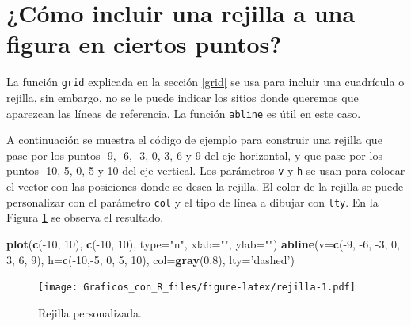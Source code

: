 \documentclass[10pt,]{krantz}
\makeatletter
\newenvironment{Shaded}{\begin{snugshade}}{\end{snugshade}}
\newcommand{\KeywordTok}[1]{\textcolor[rgb]{0.13,0.29,0.53}{\textbf{{#1}}}}
\newcommand{\DataTypeTok}[1]{\textcolor[rgb]{0.13,0.29,0.53}{{#1}}}
\newcommand{\DecValTok}[1]{\textcolor[rgb]{0.00,0.00,0.81}{{#1}}}
\newcommand{\FloatTok}[1]{\textcolor[rgb]{0.00,0.00,0.81}{{#1}}}
\newcommand{\StringTok}[1]{\textcolor[rgb]{0.31,0.60,0.02}{{#1}}}
\newcommand{\NormalTok}[1]{{#1}}
\newenvironment{kframe}{%
\medskip{}
\setlength{\fboxsep}{.8em}
 \def\at@end@of@kframe{}%
 \ifinner\ifhmode%
  \def\at@end@of@kframe{\end{minipage}}%
  \begin{minipage}{\columnwidth}%
 \fi\fi%
 \def\FrameCommand##1{\hskip\@totalleftmargin \hskip-\fboxsep
 \colorbox{shadecolor}{##1}\hskip-\fboxsep
     \hskip-\linewidth \hskip-\@totalleftmargin \hskip\columnwidth}%
 \MakeFramed {\advance\hsize-\width
   \@totalleftmargin\z@ \linewidth\hsize
   \@setminipage}}%
 {\par\unskip\endMakeFramed%
 \at@end@of@kframe}
\renewenvironment{Shaded}{\begin{kframe}}{\end{kframe}}
\makeatother
\begin{document}
\section{\texorpdfstring{¿Cómo incluir una rejilla a una figura en
ciertos puntos?
\label{rejper}}{¿Cómo incluir una rejilla a una figura en ciertos puntos? }}\label{como-incluir-una-rejilla-a-una-figura-en-ciertos-puntos}

La función \texttt{grid} explicada en la sección \ref{grid} se usa para
incluir una cuadrícula o rejilla, sin embargo, no se le puede indicar
los sitios donde queremos que aparezcan las líneas de referencia. La
función \texttt{abline} es útil en este caso.

A continuación se muestra el código de ejemplo para construir una
rejilla que pase por los puntos -9, -6, -3, 0, 3, 6 y 9 del eje
horizontal, y que pase por los puntos -10,-5, 0, 5 y 10 del eje
vertical. Los parámetros \texttt{v} y \texttt{h} se usan para colocar el
vector con las posiciones donde se desea la rejilla. El color de la
rejilla se puede personalizar con el parámetro \texttt{col} y el tipo de
línea a dibujar con \texttt{lty}. En la Figura \ref{fig:rejilla} se
observa el resultado.

\begin{Shaded}
\begin{Highlighting}[]
\KeywordTok{plot}\NormalTok{(}\KeywordTok{c}\NormalTok{(-}\DecValTok{10}\NormalTok{, }\DecValTok{10}\NormalTok{), }\KeywordTok{c}\NormalTok{(-}\DecValTok{10}\NormalTok{, }\DecValTok{10}\NormalTok{), }\DataTypeTok{type=}\StringTok{"n"}\NormalTok{, }\DataTypeTok{xlab=}\StringTok{""}\NormalTok{, }\DataTypeTok{ylab=}\StringTok{""}\NormalTok{)}
\KeywordTok{abline}\NormalTok{(}\DataTypeTok{v=}\KeywordTok{c}\NormalTok{(-}\DecValTok{9}\NormalTok{, -}\DecValTok{6}\NormalTok{, -}\DecValTok{3}\NormalTok{, }\DecValTok{0}\NormalTok{, }\DecValTok{3}\NormalTok{, }\DecValTok{6}\NormalTok{, }\DecValTok{9}\NormalTok{),}
       \DataTypeTok{h=}\KeywordTok{c}\NormalTok{(-}\DecValTok{10}\NormalTok{,-}\DecValTok{5}\NormalTok{, }\DecValTok{0}\NormalTok{, }\DecValTok{5}\NormalTok{, }\DecValTok{10}\NormalTok{), }\DataTypeTok{col=}\KeywordTok{gray}\NormalTok{(}\FloatTok{0.8}\NormalTok{), }\DataTypeTok{lty=}\StringTok{'dashed'}\NormalTok{)}
\end{Highlighting}
\end{Shaded}

\begin{figure}[htbp]
\centering
\texttt{[image: Graficos\_con\_R\_files/figure-latex/rejilla-1.pdf]}
\caption{\label{fig:rejilla}Rejilla personalizada.}
\end{figure}
\end{document}
